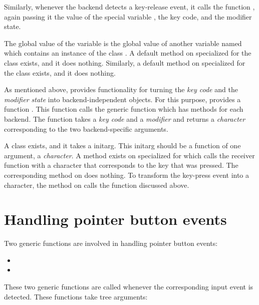 Similarly, whenever the backend detects a key-release event, it calls
the function , again passing it the value of
the special variable , the key code, and the
modifier state.

The global value of the variable  is the global
value of another variable named  which
contains an instance of the class .  A default
method on  specialized for the
 class exists, and it does nothing.  Similarly,
a default method on  specialized for the
 class exists, and it does nothing.

As mentioned above, \clim{} provides functionality for turning the
\emph{key code} and the \emph{modifier state} into backend-independent
objects.  For this purpose, \clim{} provides a function
.  This function calls the generic
function  which has methods for each
backend.  The function  takes a \emph{key
  code} and a \emph{modifier} and returns a \cl{} \emph{character}
corresponding to the two backend-specific arguments. 

A class  exists, and it takes a
 initarg.  This initarg should be a function of one
argument, a \emph{character}.  A method exists on
 specialized for 
which calls the receiver function with a character that corresponds to
the key that was pressed.  The corresponding method on
 does nothing.  To transform the key-press
event into a character, the method on  calls
the function  discussed above.

\section{Handling pointer button events}

Two generic functions are involved in handling pointer button events:

\begin{itemize}
\item {}
\item {}
\end{itemize}

These two generic functions are called whenever the corresponding
input event is detected.  These functions take tree arguments:

